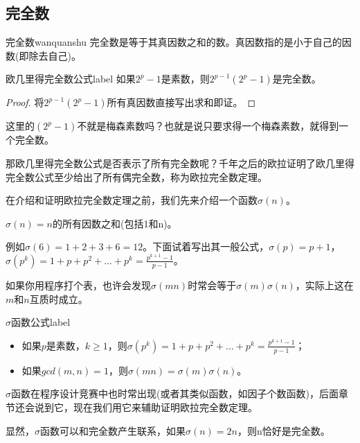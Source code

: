 \subsection{完全数}

\begin{definition}{完全数}{wanquanshu}
	完全数是等于其真因数之和的数。真因数指的是小于自己的因数(即除去自己)。
\end{definition}


\begin{theorem}{欧几里得完全数公式}{label}
	如果$2^p-1$是素数，则$2^{p-1}(2^p-1)$是完全数。
\end{theorem}

\begin{proof}
	将$2^{p-1}(2^p-1)$所有真因数直接写出求和即证。
\end{proof}

这里的$(2^p-1)$不就是梅森素数吗？也就是说只要求得一个梅森素数，就得到一个完全数。

那欧几里得完全数公式是否表示了所有完全数呢？千年之后的欧拉证明了欧几里得完全数公式至少给出了所有{\heiti 偶完全数}，称为欧拉完全数定理。

在介绍和证明欧拉完全数定理之前，我们先来介绍一个函数$\sigma(n)$。

\begin{center}
	$\sigma(n) = n$的所有因数之和(包括1和n)。
\end{center}

例如$\sigma(6) = 1 + 2+3+6 = 12$。下面试着写出其一般公式，$\sigma(p) = p+1$，$\sigma(p^k) = 1 + p+p^2+...+p^k = \frac{p^{k+1}-1}{p-1}$。

如果你用程序打个表，也许会发现$\sigma(mn)$时常会等于$\sigma(m)\sigma(n)$，实际上这在$m$和$n$互质时成立。

\begin{theorem}{$\sigma$函数公式}{label}
	\begin{itemize}
		\item 如果$p$是素数，$k\ge1$，则$\sigma(p^k) = 1 + p+p^2+...+p^k = \frac{p^{k+1}-1}{p-1}$；
		\item 如果$gcd(m,n)=1$，则$\sigma(mn) = \sigma(m)\sigma(n)$。
	\end{itemize} 
\end{theorem}

$\sigma$函数在程序设计竞赛中也时常出现(或者其类似函数，如因子个数函数)，后面章节还会说到它，现在我们用它来辅助证明欧拉完全数定理。

显然，$\sigma$函数可以和完全数产生联系，如果$\sigma(n)=2n$，则n恰好是完全数。

